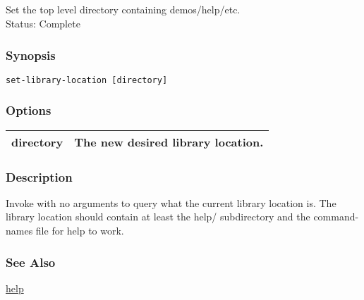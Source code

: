 \subsection{}
\label{set-library-location}
Set the top level directory containing demos/help/etc.\\ 
 Status: Complete
\subsubsection*{Synopsis}
\begin{verbatim}
set-library-location [directory] 
\end{verbatim}
\subsubsection*{Options}
\begin{tabular}{|l|l|}
\hline 
 directory  & The new desired library location.  \\
 \hline 
\end{tabular}
\subsubsection*{Description}
 Invoke with no arguments to query what the current library location is. The library location should contain at least the help/ subdirectory and the command-names file for help to work. 
\subsubsection*{See Also}
\hyperref[help]{help} 
